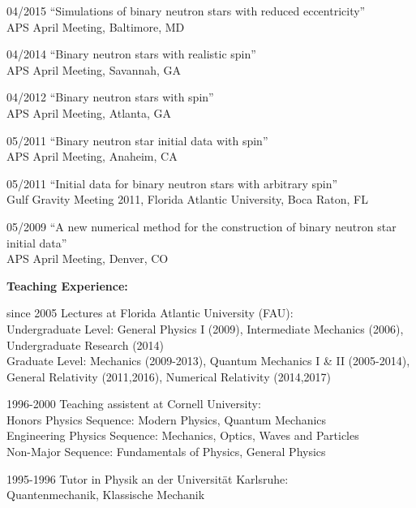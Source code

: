 \documentclass[11pt]{article}
\begin{document}
\begin{list}{}{\leftmargin=5em =1.5em \rightmargin=-8em =7em}
\item[04/2015] ``Simulations of binary neutron stars with reduced
		 eccentricity''\\
		{APS April Meeting, Baltimore, MD}
\item[04/2014] ``Binary neutron stars with realistic spin''\\
		{APS April Meeting, Savannah, GA}
\item[04/2012] ``Binary neutron stars with spin''\\
		{APS April Meeting, Atlanta, GA}
\item[05/2011] ``Binary neutron star initial data with spin''\\
		{APS April Meeting, Anaheim, CA}
\item[05/2011] ``Initial data for binary neutron stars with arbitrary spin''\\
                {Gulf Gravity Meeting 2011},
		{Florida Atlantic University, Boca Raton, FL}
\item[05/2009] ``A new numerical method for the construction of binary
		neutron star initial data''\\
		{APS April Meeting, Denver, CO}
\end{list}


\bigskip

{\bf Teaching Experience:}

\begin{list}{}{\leftmargin=6em =1.5em \rightmargin=-8em =9em}
\item[since 2005]	Lectures at Florida Atlantic University (FAU):
\\
		Undergraduate Level:
		General Physics I (2009), Intermediate Mechanics (2006),\\
		Undergraduate Research (2014)
\\
		Graduate Level:
		Mechanics (2009-2013), Quantum Mechanics I \& II (2005-2014),\\
		General Relativity (2011,2016), Numerical Relativity (2014,2017)
\item[ 1996-2000]	Teaching assistent at Cornell University:\\
		Honors Physics Sequence: Modern Physics, Quantum Mechanics\\
		Engineering Physics Sequence: Mechanics,
		Optics, Waves and Particles \\
		Non-Major Sequence: Fundamentals of Physics, 
		General Physics 
\item[1995-1996]	Tutor in Physik an der Universität Karlsruhe:\\
	Quantenmechanik, Klassische Mechanik
\end{list}
\end{document}

